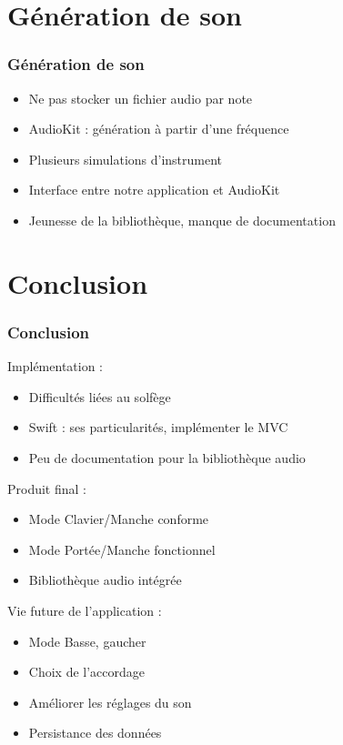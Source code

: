 \documentclass{beamer}
\begin{document}
	\section{Génération de son}
		\begin{frame}

		\frametitle{Génération de son}
			\begin{itemize}
				\item Ne pas stocker un fichier audio par note 
				\item AudioKit : génération à partir d'une fréquence
				\item Plusieurs simulations d'instrument
				\item Interface entre notre application et AudioKit 
				\item Jeunesse de la bibliothèque, manque de documentation
			\end{itemize}
		\end{frame}
\section{Conclusion}
		\begin{frame}
		\frametitle{Conclusion}
			Implémentation :
			\begin{itemize}
			\item Difficultés liées au solfège
			\item Swift : ses particularités, implémenter le MVC
			\item Peu de documentation pour la bibliothèque audio
			\end{itemize}
			\pause
			Produit final :
			\begin{itemize}
			\item Mode Clavier/Manche conforme
			\item Mode Portée/Manche fonctionnel
			\item Bibliothèque audio intégrée
			\end{itemize}
			\pause

			Vie future de l'application :
			\begin{itemize}
				\item Mode Basse, gaucher
				\item Choix de l'accordage 
				\item Améliorer les réglages du son
				\item Persistance des données
			\end{itemize}
		\end{frame}
\end{document}
